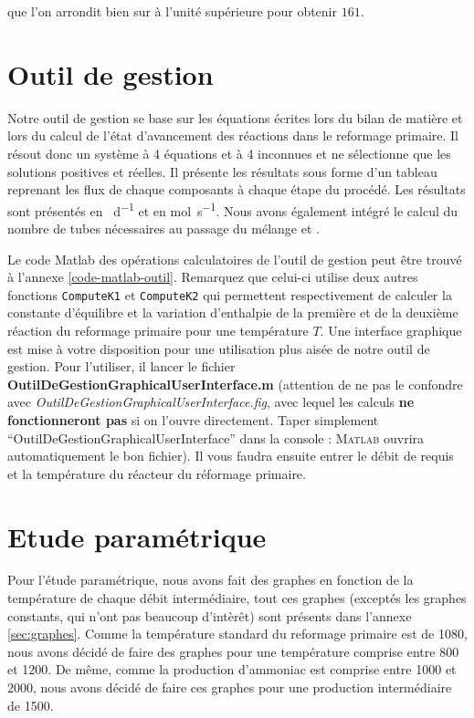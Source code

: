 que l'on arrondit bien sur à l'unité supérieure pour obtenir $161$.

\section{Outil de gestion}
Notre outil de gestion se base sur les équations écrites lors du
bilan de matière et lors du calcul de l'état d'avancement des réactions
dans le reformage primaire. Il résout donc un système à 4 équations
et à 4 inconnues et ne sélectionne que les solutions positives et réelles.
Il présente les résultats sous forme d'un tableau reprenant les flux de chaque
composants à chaque étape du procédé. Les résultats sont présentés en \unit{\ton\per\day} et en \unit{\mole\per\second}.
Nous avons également intégré le calcul du nombre de tubes nécessaires au
passage du mélange  et .

Le code Matlab des opérations calculatoires de l'outil de gestion peut être trouvé à l'annexe \ref{code-matlab-outil}.
Remarquez que celui-ci utilise deux autres fonctions \lstinline{ComputeK1}
et \lstinline{ComputeK2} qui permettent respectivement de calculer la constante
d'équilibre et la variation d'enthalpie de la première et de la deuxième
réaction du reformage primaire pour une température $T$.
Une interface graphique est mise à votre disposition pour une utilisation plus aisée de notre outil de gestion.
Pour l'utiliser, il lancer le fichier \textbf{OutilDeGestionGraphicalUserInterface.m}
(attention de ne pas le confondre avec \textit{OutilDeGestionGraphicalUserInterface.fig},
avec lequel les calculs \textbf{ne fonctionneront pas} si on l'ouvre directement. Taper simplement
``OutilDeGestionGraphicalUserInterface'' dans la console : \textsc{Matlab}
ouvrira automatiquement le bon fichier). Il vous faudra ensuite entrer le débit de
 requis et la température du réacteur du réformage primaire.

\section{Etude paramétrique}
Pour l'étude paramétrique, nous avons fait des
graphes en fonction de la température de chaque
débit intermédiaire, tout ces graphes (exceptés
les graphes constants, qui n'ont pas beaucoup
d'intèrêt) sont présents dans l'annexe 
\ref{sec:graphes}. Comme la température
standard du reformage primaire est de 
\unit{1080}{\kelvin}, nous avons décidé
de faire des graphes pour une température
comprise entre 800 et \unit{1200}{\kelvin}.
De même, comme la production d'ammoniac
est comprise entre 1000 et \unit{2000}{\ton\per\dday},
nous avons décidé de faire ces graphes pour
une production intermédiaire de 
\unit{1500}{\ton\per\dday}.

